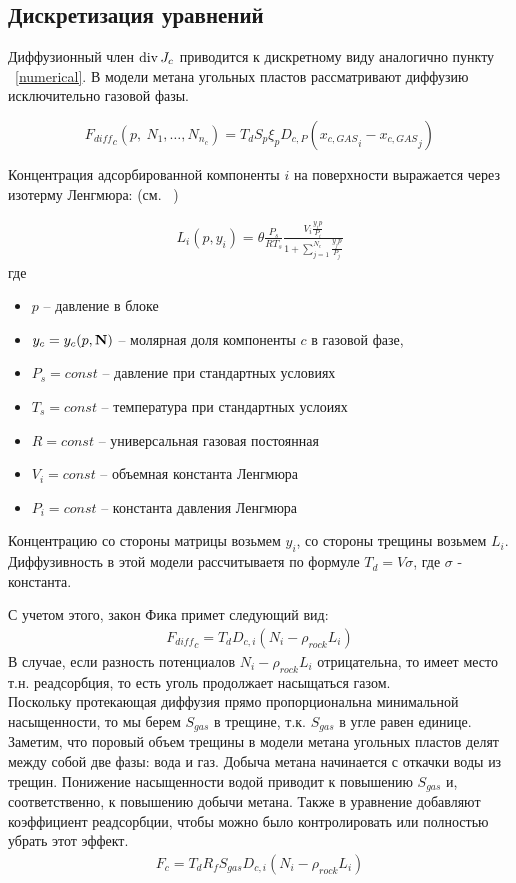 \documentclass[12pt,a4paper]{article}
\def\Div{\mathop{\rm div}\nolimits}
\begin{document}
\subsection {Дискретизация уравнений}

Диффузионный член $\Div J_c$ приводится к дискретному виду аналогично пункту ~\ref{numerical}. В модели метана угольных пластов рассматривают диффузию исключительно газовой фазы.

$$ {F_{diff}}_c ( p, \ N_1, \dots ,  N_{n_c} ) =T_dS_p\xi_pD_{c,P}({x_{c,GAS}}_i - {x_{c,GAS}}_j)$$

Концентрация адсорбированной компоненты $i$ на поверхности выражается через изотерму Ленгмюра: (см. ~\cite{ArriYee})

\begin{eqnarray}
L_i (p, y_i) = \theta \frac {P_s}{RT_s}\frac{V_i\frac{y_ip}{P_i}}{1 + \sum\limits_{j=1}^{N_c}{\frac{y_jp}{P_j}}}
\end{eqnarray}
где
\begin{itemize}
\item $p$ -- давление в блоке
\item $y_c = y_c(p, \bf N)$ -- молярная доля компоненты $c$ в газовой фазе,
\item $P_s = const$ -- давление при стандартных условиях
\item $T_s = const$ -- температура при стандартных услоиях
\item $R = const$ -- универсальная газовая постоянная
\item $V_i = const$ -- объемная константа Ленгмюра 
\item $P_i = const$ -- константа давления Ленгмюра
\end{itemize}

Концентрацию со стороны матрицы возьмем $y_i$, со стороны трещины возьмем $L_i$.
Диффузивность в этой модели рассчитываетя по формуле $T_d=V\sigma$, где $\sigma$ - константа.

С учетом этого, закон Фика примет следующий вид:
\begin{eqnarray}
{F_{diff}}_c = T_dD_{c,i}(N_i - \rho_{rock}L_i)
\end{eqnarray}
В случае, если разность потенциалов $N_i -\rho_{rock}L_i$ отрицательна, то имеет место т.н. реадсорбция, то есть уголь продолжает насыщаться газом.\\
Поскольку протекающая диффузия прямо пропорциональна минимальной насыщенности, то мы берем $S_{gas}$ в трещине, т.к. $S_{gas}$ в угле равен единице. Заметим, что поровый объем трещины в модели метана угольных пластов делят между собой две фазы: вода и газ. Добыча метана начинается с откачки воды из трещин. Понижение насыщенности водой приводит к повышению $S_{gas}$ и, соответственно, к повышению добычи метана. Также в уравнение добавляют коэффициент реадсорбции, чтобы можно было контролировать или полностью убрать этот эффект.
\begin{eqnarray}
F_c = T_dR_fS_{gas}D_{c,i}(N_i - \rho_{rock}L_i)
\end{eqnarray}
\end{document}

